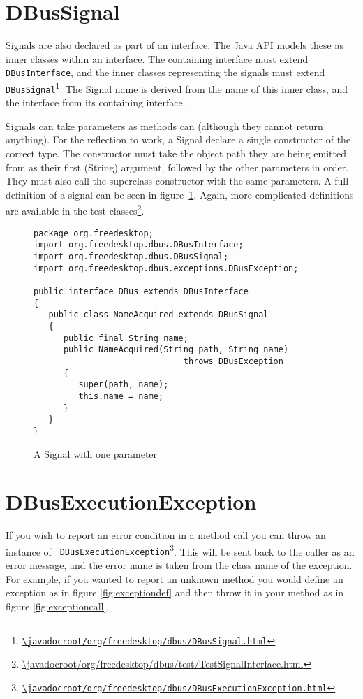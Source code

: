 \documentclass[a4paper,12pt]{article}
\begin{document}
\section{DBusSignal}

Signals are also declared as part of an interface. The Java API
models these as inner classes within an interface. The containing
interface must extend {\tt DBusInterface}, and the inner classes
representing the signals must extend {\tt
DBusSignal\footnote{\url{\javadocroot/org/freedesktop/dbus/DBusSignal.html}}}.
The Signal name is derived from the name of this inner class, and
the interface from its containing interface.

Signals can take parameters as methods can (although they cannot return
      anything). For the reflection to work, a Signal declare a single
constructor of the correct type. The constructor must  take the object path
they are being emitted from as their first (String) argument, followed by the
other parameters in order. They must also call the superclass constructor with
the same parameters.  A full definition of a signal can be seen in
figure~\ref{fig:signal}. Again, more complicated definitions are available in
the test
classes\footnote{\url{\javadocroot/org/freedesktop/dbus/test/TestSignalInterface.html}}.

\begin{figure}[htb]
\begin{center}
\begin{verbatim}
package org.freedesktop;
import org.freedesktop.dbus.DBusInterface;
import org.freedesktop.dbus.DBusSignal;
import org.freedesktop.dbus.exceptions.DBusException;

public interface DBus extends DBusInterface
{
   public class NameAcquired extends DBusSignal
   {
      public final String name;
      public NameAcquired(String path, String name) 
                              throws DBusException
      {
         super(path, name);
         this.name = name;
      }
   }
}
\end{verbatim}
\end{center}
\caption{A Signal with one parameter}
\label{fig:signal}
\end{figure}

\section{DBusExecutionException}

If you wish to report an error condition in a method call you can throw an
instance of {\tt
DBusExecutionException\footnote{\url{\javadocroot/org/freedesktop/dbus/DBusExecutionException.html}}}.
This will be sent back to the caller as an error message, and the error name is
taken from the class name of the exception. For example, if you wanted to
report an unknown method you would define an exception as in figure
\ref{fig:exceptiondef} and then throw it in your method as in figure
\ref{fig:exceptioncall}.
\end{document}
